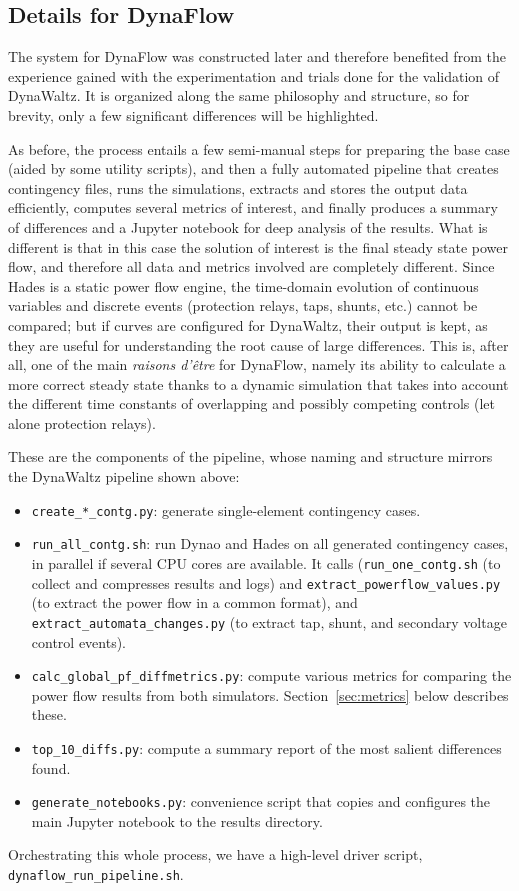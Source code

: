 \documentclass[conference]{IEEEtran}
\newcommand{\Dynawo}{Dyna\textomega o\xspace} %
\newcommand{\code}[1]{\texttt{#1}}
\begin{document}
\subsection{Details for DynaFlow}

The system for DynaFlow was constructed later and therefore benefited from the
experience gained with the experimentation and trials done for the validation of
DynaWaltz. It is organized along the same philosophy and structure, so for
brevity, only a few significant differences will be highlighted. 

As before, the process entails a few semi-manual steps for preparing the base
case (aided by some utility scripts), and then a fully automated pipeline that
creates contingency files, runs the simulations, extracts and stores the output
data efficiently, computes several metrics of interest, and finally produces a
summary of differences and a Jupyter notebook for deep analysis of the results.
What is different is that in this case the solution of interest is the final
steady state power flow, and therefore all data and metrics involved are
completely different. Since Hades is a static power flow engine, the time-domain
evolution of continuous variables and discrete events (protection relays, taps,
shunts, etc.) cannot be compared; but if curves are configured for DynaWaltz,
their output is kept, as they are useful for understanding the root cause of
large differences.  This is, after all, one of the main \emph{raisons d'être}
for DynaFlow, namely its ability to calculate a more correct steady state thanks
to a dynamic simulation that takes into account the different time constants of
overlapping and possibly competing controls (let alone protection relays).

These are the components of the pipeline, whose naming and structure mirrors the
DynaWaltz pipeline shown above:
\begin{itemize}
\item \code{create\_*\_contg.py}: generate single-element contingency cases.
\item \code{run\_all\_contg.sh}: run \Dynawo and Hades on all generated
  contingency cases, in parallel if several CPU cores are available.  It calls
  (\code{run\_one\_contg.sh} (to collect and compresses results and logs) and
  \code{extract\_powerflow\_values.py} (to extract the power flow in a common
  format), and \code{extract\_automata\_changes.py} (to extract tap, shunt, and
  secondary voltage control events).
\item \code{calc\_global\_pf\_diffmetrics.py}: compute various metrics
  for comparing the power flow results from both
  simulators. Section~\ref{sec:metrics} below describes these.
\item \code{top\_10\_diffs.py}: compute a summary report of the most salient
  differences found.
\item \code{generate\_notebooks.py}: convenience script that copies and
  configures the main Jupyter notebook to the results directory.
\end{itemize}
Orchestrating this whole process, we have a high-level driver script,
\code{dynaflow\_run\_pipeline.sh}.
\end{document}
